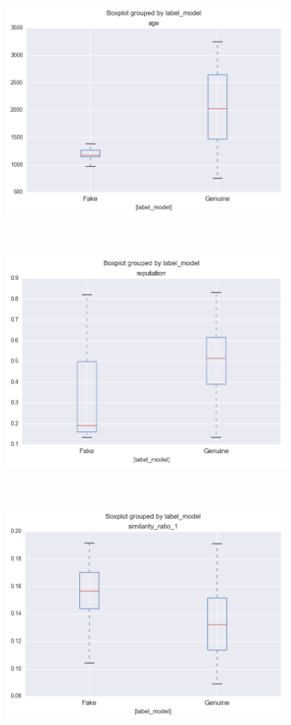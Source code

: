 \documentclass[a4paper, 12pt]{report}
\begin{document}
\begin{figure}[H]
\begin{subfigure}[c]{0.3\linewidth}
    	\includegraphics[width =\linewidth]{age.png}
    \end{subfigure}
	~
	\begin{subfigure}[c]{0.3\linewidth}
		\includegraphics[width =\linewidth]{reputation.png}
	\end{subfigure}
	~
	\begin{subfigure}[c]{0.3\linewidth}
		\includegraphics[width =\linewidth]{similarity_ratio_1.png}

\end{subfigure}
\end{figure}
\end{document}
